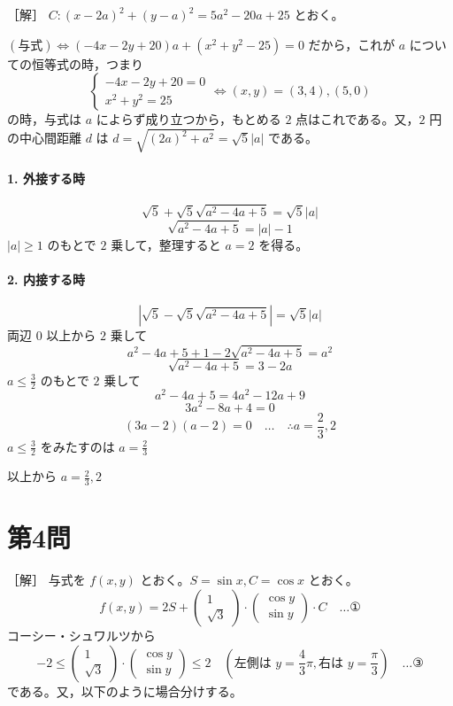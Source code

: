 \documentclass[../main.tex]{subfiles}
\begin{document}
［解］ $C: (x - 2a)^2 + (y - a)^2 = 5a^2 - 20a + 25$ とおく。

$(\text{与式}) \iff (-4x - 2y + 20)a + (x^2 + y^2 - 25) = 0$ だから，これが $a$ についての恒等式の時，つまり
\[
  \begin{cases}
    -4x - 2y + 20 = 0 \\
    x^2 + y^2 = 25
  \end{cases}
  \iff (x,y) = (3,4), (5,0)
\]
の時，与式は $a$ によらず成り立つから，もとめる $2$ 点はこれである。又，$2$ 円の中心間距離 $d$ は $d = \sqrt{(2a)^2 + a^2} = \sqrt{5}|a|$ である。

\paragraph{1. 外接する時}
\[
  \sqrt{5} + \sqrt{5}\sqrt{a^2 - 4a + 5} = \sqrt{5}|a|
\]
\[
  \sqrt{a^2 - 4a + 5} = |a| - 1
\]
$|a| \ge 1$ のもとで $2$ 乗して，整理すると $a = 2$ を得る。

\paragraph{2. 内接する時}
\[
  | \sqrt{5} - \sqrt{5}\sqrt{a^2 - 4a + 5} | = \sqrt{5}|a|
\]
両辺 $0$ 以上から $2$ 乗して
\[
  a^2 - 4a + 5 + 1 - 2\sqrt{a^2 - 4a + 5} = a^2
\]
\[
  \sqrt{a^2 - 4a + 5} = 3 - 2a
\]
$a \le \frac{3}{2}$ のもとで $2$ 乗して
\[
  a^2 - 4a + 5 = 4a^2 - 12a + 9
\]
\[
  3a^2 - 8a + 4 = 0
\]
\[
  (3a - 2)(a - 2) = 0 \quad \dots \quad \therefore a = \frac{2}{3}, 2
\]
$a \le \frac{3}{2}$ をみたすのは $a = \frac{2}{3}$

以上から $a = \frac{2}{3}, 2$

\newpage

\section*{第4問}

［解］ 与式を $f(x,y)$ とおく。$S = \sin x, C = \cos x$ とおく。
\[
  f(x,y) = 2S +
  \begin{pmatrix} 1 \\ \sqrt{3}
  \end{pmatrix} \cdot
  \begin{pmatrix} \cos y \\ \sin y
  \end{pmatrix} \cdot C \quad \dots \text{①}
\]
コーシー・シュワルツから
\[
  -2 \le
  \begin{pmatrix} 1 \\ \sqrt{3}
  \end{pmatrix} \cdot
  \begin{pmatrix} \cos y \\ \sin y
  \end{pmatrix} \le 2 \quad \left(\text{左側は } y = \frac{4}{3}\pi, \text{右は } y = \frac{\pi}{3}\right) \quad \dots \text{③}
\]
である。又，以下のように場合分けする。
\end{document}
